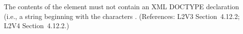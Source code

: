 The contents of the  element must not contain an XML
DOCTYPE declaration (i.e., a string beginning with the characters
.  (References: L2V3 Section~4.12.2; L2V4 Section~4.12.2.)
